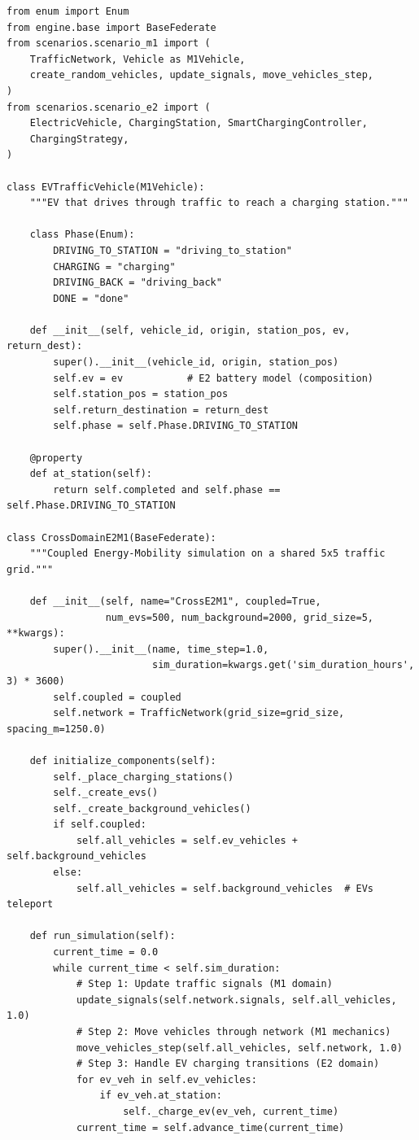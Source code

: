 \begin{listing}[H]
\begin{verbatim}
from enum import Enum
from engine.base import BaseFederate
from scenarios.scenario_m1 import (
    TrafficNetwork, Vehicle as M1Vehicle,
    create_random_vehicles, update_signals, move_vehicles_step,
)
from scenarios.scenario_e2 import (
    ElectricVehicle, ChargingStation, SmartChargingController,
    ChargingStrategy,
)

class EVTrafficVehicle(M1Vehicle):
    """EV that drives through traffic to reach a charging station."""

    class Phase(Enum):
        DRIVING_TO_STATION = "driving_to_station"
        CHARGING = "charging"
        DRIVING_BACK = "driving_back"
        DONE = "done"

    def __init__(self, vehicle_id, origin, station_pos, ev, return_dest):
        super().__init__(vehicle_id, origin, station_pos)
        self.ev = ev           # E2 battery model (composition)
        self.station_pos = station_pos
        self.return_destination = return_dest
        self.phase = self.Phase.DRIVING_TO_STATION

    @property
    def at_station(self):
        return self.completed and self.phase == self.Phase.DRIVING_TO_STATION

class CrossDomainE2M1(BaseFederate):
    """Coupled Energy-Mobility simulation on a shared 5x5 traffic grid."""

    def __init__(self, name="CrossE2M1", coupled=True,
                 num_evs=500, num_background=2000, grid_size=5, **kwargs):
        super().__init__(name, time_step=1.0,
                         sim_duration=kwargs.get('sim_duration_hours', 3) * 3600)
        self.coupled = coupled
        self.network = TrafficNetwork(grid_size=grid_size, spacing_m=1250.0)

    def initialize_components(self):
        self._place_charging_stations()
        self._create_evs()
        self._create_background_vehicles()
        if self.coupled:
            self.all_vehicles = self.ev_vehicles + self.background_vehicles
        else:
            self.all_vehicles = self.background_vehicles  # EVs teleport

    def run_simulation(self):
        current_time = 0.0
        while current_time < self.sim_duration:
            # Step 1: Update traffic signals (M1 domain)
            update_signals(self.network.signals, self.all_vehicles, 1.0)
            # Step 2: Move vehicles through network (M1 mechanics)
            move_vehicles_step(self.all_vehicles, self.network, 1.0)
            # Step 3: Handle EV charging transitions (E2 domain)
            for ev_veh in self.ev_vehicles:
                if ev_veh.at_station:
                    self._charge_ev(ev_veh, current_time)
            current_time = self.advance_time(current_time)


\end{verbatim}
\end{listing}
